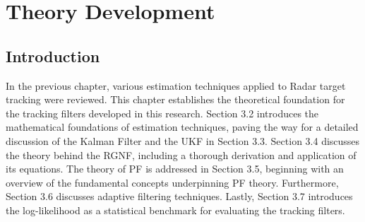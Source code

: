 \newpage
\chapter{Theory Development}
\section{Introduction}
In the previous chapter, various estimation techniques applied to \ac{Radar} target tracking were reviewed. This chapter establishes the theoretical foundation for the tracking filters developed in this research. Section 3.2 introduces the mathematical foundations of estimation techniques, paving the way for a detailed discussion of the Kalman Filter and the \ac{UKF} in Section 3.3. Section 3.4 discusses the theory behind the \ac{RGNF}, including a thorough derivation and application of its equations. The theory of \ac{PF} is addressed in Section 3.5, beginning with an overview of the fundamental concepts underpinning \ac{PF} theory. Furthermore, Section 3.6 discusses adaptive filtering techniques. Lastly, Section 3.7 introduces the log-likelihood as a statistical benchmark for evaluating the tracking filters.

